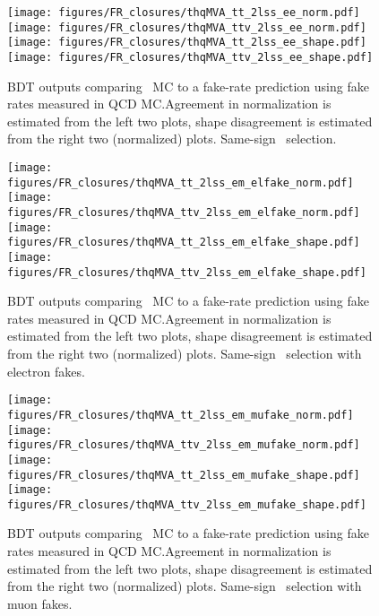 \begin{figure}[htb]
 \centering
 \texttt{[image: figures/FR\_closures/thqMVA\_tt\_2lss\_ee\_norm.pdf]} 
 \texttt{[image: figures/FR\_closures/thqMVA\_ttv\_2lss\_ee\_norm.pdf]} 
 \texttt{[image: figures/FR\_closures/thqMVA\_tt\_2lss\_ee\_shape.pdf]} 
 \texttt{[image: figures/FR\_closures/thqMVA\_ttv\_2lss\_ee\_shape.pdf]}\\ 
\caption{BDT outputs comparing \ttbar\ MC to a fake-rate prediction using fake rates measured in QCD MC.\@ Agreement in normalization is estimated from the left two plots, shape disagreement is estimated from the right two (normalized) plots. Same-sign \ee\ selection.} 
\label{fig:frclosure_2lss_ee}
\end{figure} 

\begin{figure}[htb]
 \centering
 \texttt{[image: figures/FR\_closures/thqMVA\_tt\_2lss\_em\_elfake\_norm.pdf]} 
 \texttt{[image: figures/FR\_closures/thqMVA\_ttv\_2lss\_em\_elfake\_norm.pdf]} 
 \texttt{[image: figures/FR\_closures/thqMVA\_tt\_2lss\_em\_elfake\_shape.pdf]} 
 \texttt{[image: figures/FR\_closures/thqMVA\_ttv\_2lss\_em\_elfake\_shape.pdf]}\\ 
\caption{BDT outputs comparing \ttbar\ MC to a fake-rate prediction using fake rates measured in QCD MC.\@ Agreement in normalization is estimated from the left two plots, shape disagreement is estimated from the right two (normalized) plots. Same-sign \emu\ selection with electron fakes.} 
\label{fig:frclosure_2lss_em_elfake}
\end{figure} 

\begin{figure}[htb]
 \centering
 \texttt{[image: figures/FR\_closures/thqMVA\_tt\_2lss\_em\_mufake\_norm.pdf]} 
 \texttt{[image: figures/FR\_closures/thqMVA\_ttv\_2lss\_em\_mufake\_norm.pdf]} 
 \texttt{[image: figures/FR\_closures/thqMVA\_tt\_2lss\_em\_mufake\_shape.pdf]} 
 \texttt{[image: figures/FR\_closures/thqMVA\_ttv\_2lss\_em\_mufake\_shape.pdf]}\\ 
\caption{BDT outputs comparing \ttbar\ MC to a fake-rate prediction using fake rates measured in QCD MC.\@ Agreement in normalization is estimated from the left two plots, shape disagreement is estimated from the right two (normalized) plots. Same-sign \emu\ selection with muon fakes.} 
\label{fig:frclosure_2lss_em_mufake}
\end{figure} 

